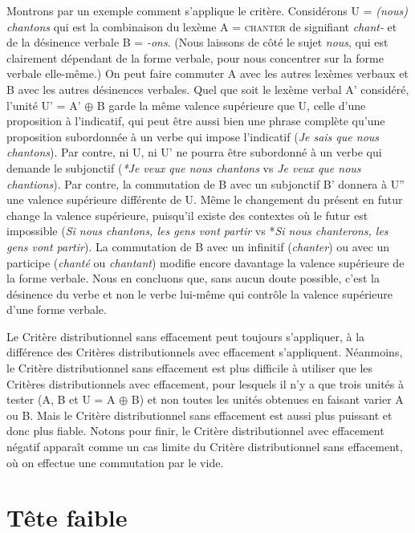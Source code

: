 Montrons par un exemple comment s’applique le critère. Considérons U = \textit{(nous) chantons} qui est la combinaison du lexème A = \textsc{chanter} de signifiant \textit{chant-} et de la désinence verbale B = \textit{{}-ons}. (Nous laissons de côté le sujet \textit{nous}, qui est clairement dépendant de la forme verbale, pour nous concentrer sur la forme verbale elle-même.)
On peut faire commuter A avec les autres lexèmes verbaux et B avec les autres désinences verbales. Quel que soit le lexème verbal A’ considéré, l’unité U’ =  A’ ${\oplus}$ B garde la même valence supérieure que U, celle d’une proposition à l’indicatif, qui peut être aussi bien une phrase complète qu’une proposition subordonnée à un verbe qui impose l’indicatif (\textit{Je sais que nous chantons}). Par contre, ni U, ni U’ ne pourra être subordonné à un verbe qui demande le subjonctif (\textit{*Je veux que nous chantons} vs \textit{Je veux que nous chantions}). Par contre, la commutation de B avec un subjonctif B' donnera à U”  une valence supérieure différente de U. Même le changement du présent en futur change la valence supérieure, puisqu’il existe des contextes où le futur est impossible (\textit{Si nous chantons, les gens vont partir} vs *\textit{Si nous chanterons, les gens vont partir}). La commutation de B avec un infinitif (\textit{chanter}) ou avec un participe (\textit{chanté} ou \textit{chantant}) modifie encore davantage la valence supérieure de la forme verbale. Nous en concluons que, sans aucun doute possible, c’est la désinence du verbe et non le verbe lui-même qui contrôle la valence supérieure d’une forme verbale.

Le Critère distributionnel sans effacement peut toujours s’appliquer, à la différence des Critères distributionnels avec effacement s’appliquent. Néanmoins, le Critère distributionnel sans effacement est plus difficile à utiliser que les Critères distributionnels avec effacement, pour lesquels il n'y a que trois unités à tester (A, B et U = A ${\oplus}$ B) et non toutes les unités obtenues en faisant varier A ou B. Mais le Critère distributionnel sans effacement est aussi plus puissant et donc plus fiable. Notons pour finir, le Critère distributionnel avec effacement négatif apparaît comme un cas limite du Critère distributionnel sans effacement, où on effectue une commutation par le vide. 

\section{Tête faible}\label{sec:3.3.14}%

